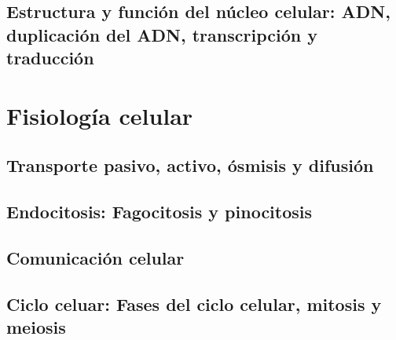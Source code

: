 \documentclass{../summarie}
\begin{document}
    \chapter{Estructura y función del núcleo celular: ADN, duplicación del ADN, transcripción y traducción}
        

\part{Fisiología celular}
    \chapter{Transporte pasivo, activo, ósmisis y difusión}
    \chapter{Endocitosis: Fagocitosis y pinocitosis}
        
        
    \chapter{Comunicación celular}
    \chapter{Ciclo celuar: Fases del ciclo celular, mitosis y meiosis}
        


\newpage 
\end{document}
